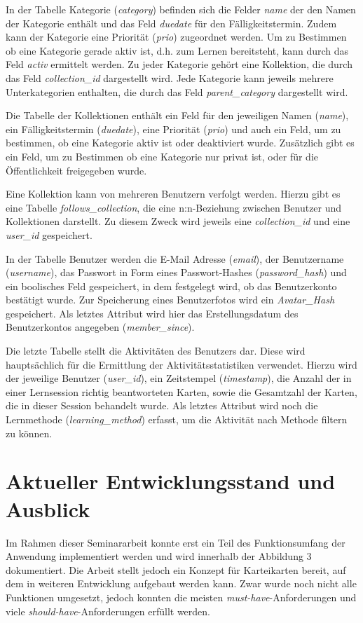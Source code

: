 In der Tabelle Kategorie (\emph{category}) befinden sich die Felder \emph{name} der den Namen der Kategorie enthält und das Feld \emph{duedate} für den Fälligkeitstermin. Zudem kann der Kategorie eine Priorität (\emph{prio}) zugeordnet werden. Um zu Bestimmen ob eine Kategorie gerade aktiv ist, d.h. zum Lernen bereitsteht, kann durch das Feld \emph{activ} ermittelt werden. Zu jeder Kategorie gehört eine Kollektion, die durch das Feld \emph{collection{\_}id} dargestellt wird. Jede Kategorie kann jeweils mehrere Unterkategorien enthalten, die durch das Feld \emph{parent{\_}category} dargestellt wird.

Die Tabelle der Kollektionen enthält ein Feld für den jeweiligen Namen (\emph{name}), ein Fälligkeitstermin (\emph{duedate}), eine Priorität (\emph{prio}) und auch ein Feld, um zu bestimmen, ob eine Kategorie aktiv ist oder deaktiviert wurde. Zusätzlich gibt es ein Feld, um zu Bestimmen ob eine Kategorie nur privat ist, oder für die Öffentlichkeit freigegeben wurde. 

Eine Kollektion kann von mehreren Benutzern verfolgt werden. Hierzu gibt es eine Tabelle \emph{follows{\_}collection}, die eine n:n-Beziehung zwischen Benutzer und Kollektionen darstellt. Zu diesem Zweck wird jeweils eine \emph{collection{\_}id} und eine \emph{user{\_}id} gespeichert. 

In der Tabelle Benutzer werden die E-Mail Adresse (\emph{email}), der Benutzername (\emph{username}), das Passwort in Form eines Passwort-Hashes (\emph{password{\_}hash}) und ein boolisches Feld gespeichert, in dem festgelegt wird, ob das Benutzerkonto bestätigt wurde. Zur Speicherung eines Benutzerfotos wird ein \emph{Avatar{\_}Hash} gespeichert. Als letztes Attribut wird hier das Erstellungsdatum des Benutzerkontos angegeben (\emph{member{\_}since}).

Die letzte Tabelle stellt die Aktivitäten des Benutzers dar. Diese wird hauptsächlich für die Ermittlung der Aktivitätsstatistiken verwendet. Hierzu wird der jeweilige Benutzer (\emph{user{\_}id}), ein Zeitstempel (\emph{timestamp}), die Anzahl der in einer Lernsession richtig beantworteten Karten, sowie die Gesamtzahl der Karten, die in dieser Session behandelt wurde. Als letztes Attribut wird noch die Lernmethode (\emph{learning{\_}method}) erfasst, um die Aktivität nach Methode filtern zu können.


\section{Aktueller Entwicklungsstand und Ausblick}
Im Rahmen dieser Seminararbeit konnte erst ein Teil des Funktionsumfang der Anwendung implementiert werden und wird innerhalb der Abbildung 3 dokumentiert. Die Arbeit stellt jedoch ein Konzept für Karteikarten bereit, auf dem in weiteren Entwicklung aufgebaut werden kann. Zwar wurde noch nicht alle Funktionen umgesetzt, jedoch konnten die meisten \emph{must-have}-Anforderungen und viele \emph{should-have}-Anforderungen erfüllt werden. 

